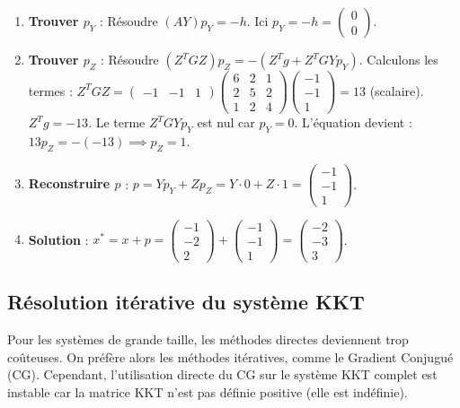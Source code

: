 \begin{enumerate}
    \item \textbf{Trouver $p_Y$} : Résoudre $(AY) p_Y = -h$. Ici $p_Y = -h = \begin{pmatrix} 0 \\ 0 \end{pmatrix}$.
    \item \textbf{Trouver $p_Z$} : Résoudre $(Z^T G Z) p_Z = -(Z^T g + Z^T G Y p_Y)$.
    Calculons les termes : 
    $Z^T G Z = \begin{pmatrix} -1 & -1 & 1 \end{pmatrix} \begin{pmatrix} 6 & 2 & 1 \\ 2 & 5 & 2 \\ 1 & 2 & 4 \end{pmatrix} \begin{pmatrix} -1 \\ -1 \\ 1 \end{pmatrix} = 13$ (scalaire).
    $Z^T g = -13$.
    Le terme $Z^T G Y p_Y$ est nul car $p_Y = 0$.
    L'équation devient : $13 p_Z = -(-13) \implies p_Z = 1$.
    \item \textbf{Reconstruire $p$} :
    $p = Y p_Y + Z p_Z = Y \cdot 0 + Z \cdot 1 = \begin{pmatrix} -1 \\ -1 \\ 1 \end{pmatrix}$.
    \item \textbf{Solution} :
    $x^* = x + p = \begin{pmatrix} -1 \\ -2 \\ 2 \end{pmatrix} + \begin{pmatrix} -1 \\ -1 \\ 1 \end{pmatrix} = \begin{pmatrix} -2 \\ -3 \\ 3 \end{pmatrix}$.
\end{enumerate}

\subsection{Résolution itérative du système KKT}

Pour les systèmes de grande taille, les méthodes directes deviennent trop coûteuses. On préfère alors les méthodes itératives, comme le Gradient Conjugué (CG).
Cependant, l'utilisation directe du CG sur le système KKT complet est instable car la matrice KKT n'est pas définie positive (elle est indéfinie).

